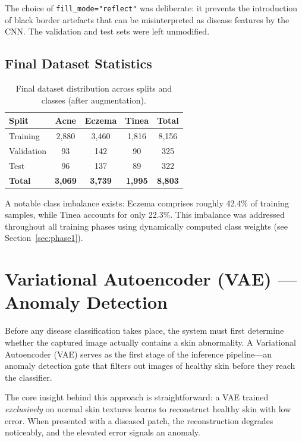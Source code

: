 The choice of \texttt{fill\_mode="reflect"} was deliberate: it prevents the introduction of black border artefacts that can be misinterpreted as disease features by the CNN. The validation and test sets were left unmodified.

\subsection{Final Dataset Statistics}

\begin{table}[H]
\centering
\caption{Final dataset distribution across splits and classes (after augmentation).}
\label{tab:dataset_stats}
\begin{tabular}{|l|c|c|c|c|}
\hline
\textbf{Split} & \textbf{Acne} & \textbf{Eczema} & \textbf{Tinea} & \textbf{Total} \\ \hline
Training  & 2{,}880 & 3{,}460 & 1{,}816 & 8{,}156 \\ \hline
Validation & 93 & 142 & 90 & 325 \\ \hline
Test & 96 & 137 & 89 & 322 \\ \hline
\textbf{Total} & \textbf{3{,}069} & \textbf{3{,}739} & \textbf{1{,}995} & \textbf{8{,}803} \\ \hline
\end{tabular}
\end{table}

A notable class imbalance exists: Eczema comprises roughly 42.4\% of training samples, while Tinea accounts for only 22.3\%. This imbalance was addressed throughout all training phases using dynamically computed class weights (see Section~\ref{sec:phase1}).


\section{Variational Autoencoder (VAE) --- Anomaly Detection}
\label{sec:vae}

Before any disease classification takes place, the system must first determine whether the captured image actually contains a skin abnormality. A Variational Autoencoder (VAE) serves as the first stage of the inference pipeline---an anomaly detection gate that filters out images of healthy skin before they reach the classifier.

The core insight behind this approach is straightforward: a VAE trained \textit{exclusively} on normal skin textures learns to reconstruct healthy skin with low error. When presented with a diseased patch, the reconstruction degrades noticeably, and the elevated error signals an anomaly.

